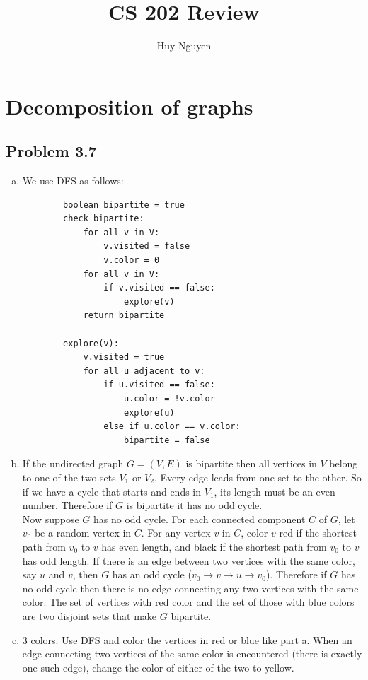 \documentclass[12pt]{report}
\title{CS 202 Review}
\author{Huy Nguyen}
\begin{document}
\tableofcontents

\chapter[Chapter 3 Solution]{Decomposition of graphs}
\section{Problem 3.7}
\begin{enumerate}[(a)]
	\item We use DFS as follows:
	\begin{lstlisting}
		boolean bipartite = true
		check_bipartite:
			for all v in V:
				v.visited = false
				v.color = 0
			for all v in V:
				if v.visited == false:
					explore(v)
			return bipartite

		explore(v):
			v.visited = true
			for all u adjacent to v:
				if u.visited == false:
					u.color = !v.color
					explore(u)
				else if u.color == v.color:
					bipartite = false

	\end{lstlisting}
	\item 
	If the undirected graph $G=(V,E)$ is bipartite then all vertices in $V$ belong to one of the two sets $V_1$ or $V_2$. Every edge leads from one set to the other. So if we have a cycle that starts and ends in $V_1$, its length must be an even number. Therefore if $G$ is bipartite it has no odd cycle. \\
	Now suppose $G$ has no odd cycle. For each connected component $C$ of $G$, let $v_0$ be a random vertex in $C$. For any vertex $v$ in $C$, color $v$ red if the shortest path from $v_0$ to $v$ has even length, and black if the shortest path from $v_0$ to $v$ has odd length. If there is an edge between two vertices with the same color, say $u$ and $v$, then $G$ has an odd cycle ($v_0 \to v \to u \to v_0$). Therefore if $G$ has no odd cycle then there is no edge connecting any two vertices with the same color. The set of vertices with red color and the set of those with blue colors are two disjoint sets that make $G$ bipartite.
	\item $3$ colors. Use DFS and color the vertices in red or blue like part a. When an edge connecting two vertices of the same color is encountered (there is exactly one such edge), change the color of either of the two to yellow.
\end{enumerate}
\end{document}
